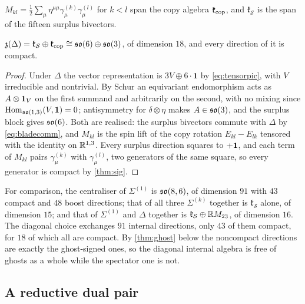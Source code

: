 \begin{definition}
$M_{kl}=\tfrac12\sum_\mu\eta^{\mu\mu}\gamma^{(k)}_\mu\gamma^{(l)}_\mu$ for $k<l$ span the copy algebra $\mathfrak k_{\rm cop}$, and
$\mathfrak k_{\mathcal S}$ is the span of the fifteen surplus bivectors.
\end{definition}

\begin{theorem}
\label{thm:diagcent}
$\mathfrak z(\Delta)=\mathfrak k_{\mathcal S}\oplus\mathfrak k_{\rm cop}\cong\mathfrak{so}(6)\oplus\mathfrak{so}(3)$, of dimension $18$, and every direction of it is compact.
\end{theorem}

\begin{proof}
Under $\Delta$ the vector representation is $3V\oplus6\cdot\mathbf1$ by \eqref{eq:tensorpic}, with $V$ irreducible and nontrivial. By Schur
an equivariant endomorphism acts as $A\otimes\mathbf 1_V$ on the first summand and arbitrarily on the second, with no mixing since
$\operatorname{Hom}_{\mathfrak{so}(1,3)}(V,\mathbf1)=0$; antisymmetry for $\delta\otimes\eta$ makes $A\in\mathfrak{so}(3)$, and the surplus block gives $\mathfrak{so}(6)$. Both are
realised: the surplus bivectors commute with $\Delta$ by \eqref{eq:bladecomm}, and $M_{kl}$ is the spin lift of the copy rotation
$E_{kl}-E_{lk}$ tensored with the identity on $\mathbb{R}^{1,3}$. Every surplus direction squares to $+\mathbf 1$, and each term of $M_{kl}$ pairs
$\gamma^{(k)}_\mu$ with $\gamma^{(l)}_\mu$, two generators of the same square, so every generator is compact by \cref{thm:sig}.
\end{proof}

For comparison, the centraliser of $\Sigma^{(1)}$ is $\mathfrak{so}(8,6)$, of dimension $91$ with $43$ compact and $48$ boost directions; that of all
three $\Sigma^{(k)}$ together is $\mathfrak k_{\mathcal S}$ alone, of dimension $15$; and that of $\Sigma^{(1)}$ and $\Delta$ together is
$\mathfrak k_{\mathcal S}\oplus\mathbb{R} M_{23}$, of dimension $16$. The diagonal choice exchanges $91$ internal directions, only $43$ of them
compact, for $18$ of which all are compact. By \cref{thm:ghost} below the noncompact directions are exactly the ghost-signed ones, so the
diagonal internal algebra is free of ghosts as a whole while the spectator one is not.

\subsection{A reductive dual pair}
\label{sec:dualpair}

